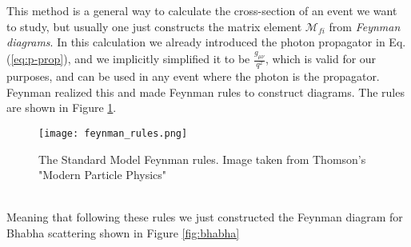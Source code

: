 \documentclass[12pt, a4paper]{book}
\begin{document}
This method is a general way to calculate the cross-section of an event we want to study, but usually one just constructs the matrix element $\mathcal{M}_{fi}$ from \textit{Feynman diagrams}. In this calculation we 
already introduced the photon propagator in Eq. (\ref{eq:p-prop}), and we implicitly simplified it to be $\frac{g_{\mu\nu}}{q^2}$, which is valid for our purposes, and can be used in any event where the photon is the propagator. 
Feynman realized this and made Feynman rules to construct diagrams. The rules are shown in Figure \ref{fig:feynman_rules}. \\
\graphicspath{{../../figures/}}
\begin{figure}[!ht]
    \centering
    \texttt{[image: feynman\_rules.png]}
    \caption[Standard Model Feynman Rules]{The Standard Model Feynman rules. Image taken from Thomson's "Modern Particle Physics" \cite{THOMSON}}\label{fig:feynman_rules}
\end{figure}
\\Meaning that following these rules we just constructed the Feynman diagram for Bhabha scattering shown in Figure \ref{fig:bhabha}
\end{document}
